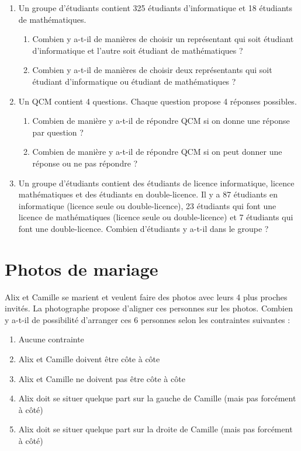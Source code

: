 \documentclass[a4paper,11pt]{article}
\begin{document}
\begin{enumerate}
\item Un groupe d'étudiants contient 325 étudiants d'informatique et 18 étudiants de mathématiques.
\begin{enumerate}
\item Combien y a-t-il de manières de choisir un représentant qui soit étudiant d'informatique et l'autre soit étudiant de mathématiques ?
\item Combien y a-t-il de manières de choisir deux représentants qui soit étudiant d'informatique ou étudiant de mathématiques ?
\end{enumerate}

\item Un QCM contient 4 questions. Chaque question propose 4 réponses possibles.
\begin{enumerate}
\item Combien de manière y a-t-il de répondre QCM si on donne une réponse par question ?
\item Combien de manière y a-t-il de répondre QCM si on peut donner une réponse ou ne pas répondre ?
\end{enumerate}

\item Un groupe d'étudiants contient des étudiants de licence informatique, licence mathématiques et des étudiants en double-licence. Il y a 87 étudiants en informatique (licence seule ou double-licence), 23 étudiants qui font une licence de mathématiques (licence seule ou double-licence) et 7 étudiants qui font une double-licence. Combien d'étudiants y a-t-il dans le groupe ?
\end{enumerate}

\section{Photos de mariage}

Alix et Camille se marient et veulent faire des photos avec leurs 4 plus proches invités. La photographe propose d'aligner ces personnes sur les photos. Combien y a-t-il de possibilité d'arranger ces 6 personnes selon les contraintes suivantes :

\begin{enumerate}
\item Aucune contrainte

\item Alix et Camille doivent être côte à côte

\item Alix et Camille ne doivent pas être côte à côte

\item Alix doit se situer quelque part sur la gauche de Camille (mais pas forcément à côté)

\item Alix doit se situer quelque part sur la droite de Camille (mais pas forcément à côté)
\end{enumerate}
\end{document}
